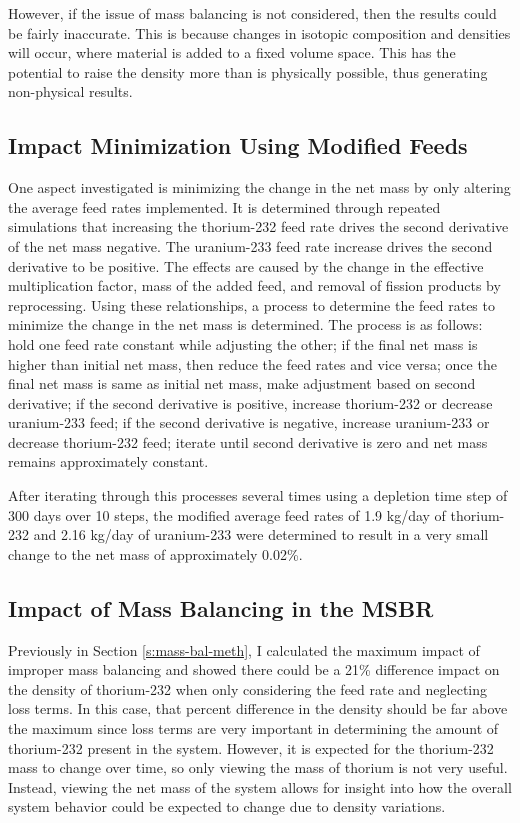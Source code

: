 However, if the issue of mass balancing is not considered, then the results could be fairly inaccurate.
This is because changes in isotopic composition and densities will occur, where material is added to a fixed volume space. This has the potential to raise the density more than is physically possible, thus generating non-physical results.

\subsection{Impact Minimization Using Modified Feeds}

One aspect investigated is minimizing the change in the net mass by only altering the average feed rates implemented. It is determined through repeated simulations that increasing the thorium-232 feed rate drives the second derivative of the net mass negative. The uranium-233 feed rate increase drives the second derivative to be positive. The effects are caused by the change in the effective multiplication factor, mass of the added feed, and removal of fission products by reprocessing.
Using these relationships, a process to determine the feed rates to minimize the change in the net mass is determined. The process is as follows:  hold one feed rate constant while adjusting the other;
if the final net mass is higher than initial net mass, then reduce the feed rates and vice versa;
once the final net mass is same as initial net mass, make adjustment based on second derivative;
if the second derivative is positive, increase thorium-232 or decrease uranium-233 feed;
if the second derivative is negative, increase uranium-233 or decrease thorium-232 feed;
iterate until second derivative is zero and net mass remains approximately constant.

After iterating through this processes several times using a depletion time step of 300 days over 10 steps, the modified average feed rates of 1.9 kg/day of thorium-232 and 2.16 kg/day of uranium-233 were determined to result in a very small change to the net mass of approximately 0.02\%.

\subsection{Impact of Mass Balancing in the MSBR}

Previously in Section \ref{s:mass-bal-meth}, I calculated the maximum impact of improper mass balancing and showed there could be a 21\% difference impact on the density of thorium-232 when only considering the feed rate and neglecting loss terms. In this case, that percent difference in the density should be far above the maximum since loss terms are very important in determining the amount of thorium-232 present in the system. However, it is expected for the thorium-232 mass to change over time, so only viewing the mass of thorium is not very useful. Instead, viewing the net mass of the system allows for insight into how the overall system behavior could be expected to change due to density variations.

